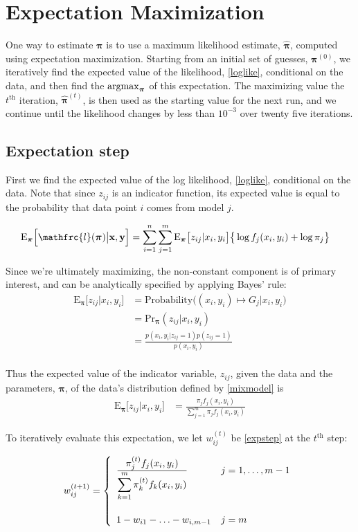\documentclass[12pt]{amsart}
\newcommand{\vect}[1]{\boldsymbol{\mathbf{#1}}}
\newcommand{\eqn}[1]{\begin{align*}
#1
\end{align*}}
\newcommand{\eqnl}[2]{\begin{align} \label{#1}
#2
\end{align}}
\newcommand{\bl}{\big\{}
\newcommand{\br}{\big\}}
\newcommand{\argmax}{\operatornamewithlimits{argmax}}
\newcommand{\eqnset}[4]{
\[ #1 = #2 \left\{ \begin{array}{#3}
        #4
\end{array} \right. \] 
}
\newcommand{\vx}{\vect{x}}
\newcommand{\vy}{\vect{y}}
\newcommand{\vp}{\vect{\pi}}
\newcommand{\vph}{\hat{\vect{\pi}}}
\newcommand{\fab}{f_j}
\newcommand{\llp}{\mathfrc{l}(\vect{\pi})}
\newcommand{\sumn}{\sum^n_{i=1}}
\newcommand{\summ}{\sum^m_{j=1}}
\newcommand{\sumk}{\sum^m_{k=1}}
\begin{document}
\section{Expectation Maximization}

One way to estimate $\vp$ is to use a maximum likelihood estimate, $\vph$, computed using expectation maximization. Starting from an initial set of guesses, $\vp^{(0)}$, we iteratively find the expected value of the likelihood, \eqref{loglike}, conditional on the data, and then find the $\argmax_{\vp}$ of this expectation. The maximizing value the $t^\text{th}$ iteration, $\vph^{(t)}$, is then used as the starting value for the next run, and we continue until the likelihood changes by less than $10^{-3}$ over twenty five iterations.

\subsection{Expectation step}
First we find the expected value of the log likelihood, \eqref{loglike}, conditional on the data. Note that since $z_{ij}$ is an indicator function, its expected value is equal to the probability that data point $i$ comes from model $j$.

\eqnl{estep}{
	\text{E}_{\vp}\Big[\llp \big| \vx,\vy \Big] &= \sumn \summ \text{E}_{\vp}\big[z_{ij}|x_i,y_i\big] \bl \log \fab(x_i,y_i) + \log \pi_j  \br
}

Since we're ultimately maximizing, the non-constant component is of primary interest, and can be analytically specified by applying Bayes' rule:
\eqn{
	\text{E}_{\vp}\Big[  z_{ij} | x_i, y_i \Big] &= \text{Probability}\Big((x_i,y_i) \mapsto G_j \big | x_i,y_i\Big)	\\
	&= \text{Pr}_{\vp}(z_{ij}|x_i,y_i)	\\
	&= \frac{p(x_i,y_i|z_{ij}=1)p(z_{ij}=1)}{p(x_i,y_i)}	\\
}

Thus the expected value of the indicator variable, $z_{ij}$, given the data and the parameters, $\vp$, of the data's distribution defined by \eqref{mixmodel} is
\eqnl{expstep}{
	\text{E}_{\vp}\Big[  z_{ij} | x_i, y_i \Big] &=  \frac{\pi_j \fab(x_i,y_i)  }{\summ \pi_j \fab(x_i,y_i)}
}

To iteratively evaluate this expectation, we let $w^{(t)}_{ij}$ be \eqref{expstep} at the $t^\text{th}$ step:
\eqnset{w^{(t+1)}_{ij}}{}{ll}{
	\frac{\displaystyle\pi^{(t)}_{j} \fab(x_i,y_i)}{\displaystyle\sumk \pi^{(t)}_{k}f_k(x_i,y_i)}				& j=1,\ldots,m-1	\\
	\vspace{1mm} & \\
	1 - w_{i1} - \ldots - w_{i,m-1}		& j=m
}
\end{document}
